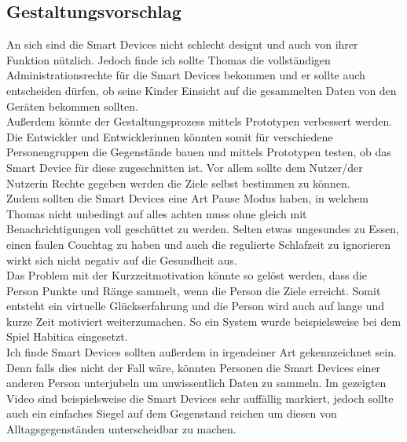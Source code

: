 \subsection{Gestaltungsvorschlag}
An sich sind die Smart Devices nicht schlecht designt und auch von ihrer Funktion nützlich. Jedoch finde ich sollte Thomas die vollständigen Administrationsrechte für die Smart Devices bekommen und er sollte auch entscheiden dürfen, ob seine Kinder Einsicht auf die gesammelten Daten von den Geräten bekommen sollten. \\
Außerdem könnte der Gestaltungsprozess mittels Prototypen verbessert werden. Die Entwickler und Entwicklerinnen könnten somit für verschiedene Personengruppen die Gegenstände bauen und mittels Prototypen testen, ob das Smart Device für diese zugeschnitten ist. Vor allem sollte dem Nutzer/der Nutzerin Rechte gegeben werden die Ziele selbst bestimmen zu können.\\
Zudem sollten die Smart Devices eine Art Pause Modus haben, in welchem Thomas nicht unbedingt auf alles achten muss ohne gleich mit Benachrichtigungen voll geschüttet zu werden. Selten etwas ungesundes zu Essen, einen faulen Couchtag zu haben und auch die regulierte Schlafzeit zu ignorieren wirkt sich nicht negativ auf die Gesundheit aus. \\
Das Problem mit der Kurzzeitmotivation könnte so gelöst werden, dass die Person Punkte und Ränge sammelt, wenn die Person die Ziele erreicht. Somit entsteht ein virtuelle Glückserfahrung und die Person wird auch auf lange und kurze Zeit motiviert weiterzumachen. So ein System wurde beispielsweise bei dem Spiel Habitica\cite{habitica} eingesetzt. \\
Ich finde Smart Devices sollten außerdem in irgendeiner Art gekennzeichnet sein. Denn falls dies nicht der Fall wäre, könnten Personen die Smart Devices einer anderen Person unterjubeln um unwissentlich Daten zu sammeln. Im gezeigten Video\cite{uninvatedGuests} sind beispielsweise die Smart Devices sehr auffällig markiert, jedoch sollte auch ein einfaches Siegel auf dem Gegenstand reichen um diesen von Alltagsgegenständen unterscheidbar zu machen.
